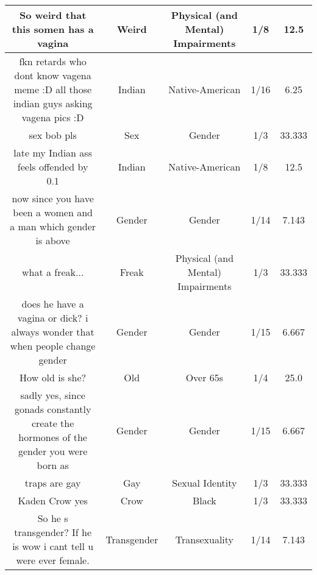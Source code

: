 \documentclass[11pt]{article}
\newlength\mylength
\begin{document}
\begin{center}
\begin{longtable}{|C{.40\mylength}|C{.30\mylength}|C{.15\mylength}|C{.15\mylength}|C{.15\mylength}|}
  So weird that this somen has a vagina  & Weird & Physical (and Mental) Impairments & 1/8 & 12.5 \\  \hline
  fkn retards who dont know vagena meme :D all those indian guys asking vagena pics :D  & Indian & Native-American & 1/16 & 6.25 \\  \hline
  sex bob pls  & Sex & Gender & 1/3 & 33.333 \\  \hline
  late my Indian ass feels offended by 0.1      & Indian & Native-American & 1/8 & 12.5 \\  \hline
  now since you have been a women and a man which gender is above  & Gender & Gender & 1/14 & 7.143 \\  \hline
  what a freak...  & Freak & Physical (and Mental) Impairments & 1/3 & 33.333 \\  \hline
  does he have a vagina or dick? i always wonder that when people change gender  & Gender & Gender & 1/15 & 6.667 \\  \hline
  How old is she?  & Old & Over 65s & 1/4 & 25.0 \\  \hline
  sadly yes, since gonads constantly create the hormones of the gender you were born as  & Gender & Gender & 1/15 & 6.667 \\  \hline
  traps are gay  & Gay & Sexual Identity & 1/3 & 33.333 \\  \hline
  Kaden Crow yes  & Crow & Black & 1/3 & 33.333 \\  \hline
  So he s transgender? If he is wow i cant tell u were ever female.  & Transgender & Transexuality & 1/14 & 7.143 \\  \hline

\end{longtable}
\end{center}
\end{document}
